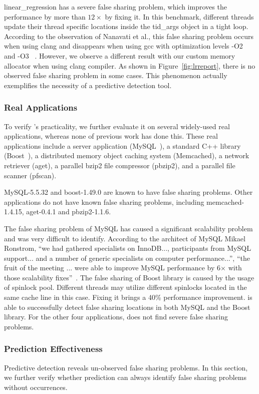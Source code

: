 linear\_regression has a severe false sharing problem, which improves the performance by more than $12\times$ by fixing it. In this benchmark, different threads update their thread specific locations inside the tid\_args object in a tight loop. According to the observation of Nanavati et al., this false sharing problem occurs when using clang and disappears when using gcc with optimization levels -O2 and -O3 ~\cite{OSdetection}. However, we observe a different result with our custom memory allocator when using clang compiler. As shown in Figure~\ref{fig:lrreport}, there is no observed false sharing problem in some cases. This phenomenon actually exemplifies the necessity of a predictive detection tool. 

\subsubsection{Real Applications}
To verify \Predator{}'s practicality, we further evaluate it on several widely-used real applications, whereas none of previous work has done this. These real applications include a server application (MySQL~\cite{mysql}),
a standard C++ library (Boost~\cite{libfalsesharing}),
a distributed memory object caching system (Memcached), a network retriever (aget),
a parallel bzip2 file compressor (pbzip2), and a parallel file scanner (pfscan).

MySQL-5.5.32 and boost-1.49.0 are known to have false sharing problems. Other applications do not have known false sharing problems, including memcached-1.4.15, aget-0.4.1 and pbzip2-1.1.6.

The false sharing problem of MySQL has caused a significant scalability problem and was very difficult to identify.
According to the architect of MySQL Mikael Ronstrom, ``we had gathered specialists on InnoDB..., participants from MySQL support... and a number of generic specialists on 
computer performance...'', ``the fruit of the meeting ... were able to improve MySQL performance by 6$\times$ with those scalability fixes''~\cite{mysql}. 
The false sharing of Boost library is caused by the usage of spinlock pool. Different threads may utilize different spinlocks located in the same cache line in this case. Fixing it brings a 40\% performance improvement.
\Predator{} is able to successfully detect false sharing locations in both MySQL and the Boost library. 
For the other four applications, \Predator{} does not find severe false sharing problems.

\subsubsection{Prediction Effectiveness}
\label{sec:predicteval}
Predictive detection reveals un-observed false sharing problems. In this section, we further verify whether prediction can always identify false sharing problems without occurrences.

